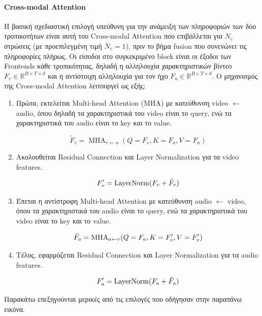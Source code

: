 \paragraph{Cross-modal Attention}
Η βασική σχεδιαστική επιλογή υπεύθυνη για την ανάμειξη των πληροφοριών των δύο τροπικοτήτων είναι αυτή του Cross-modal Attention που επιβάλλεται για $N_c$ στρώσεις (με προεπιλεγμένη τιμή $N_c = 1$), πριν το βήμα fusion που συνενώνει τις πληροφορίες πλήρως. Οι είσοδοι στο συγκεκριμένο block είναι οι έξοδοι των Frontends κάθε τροπικότητας, δηλαδή η αλληλουχία χαρακτηριστικών βίντεο $F_v \in \mathbb{R}^{B \times T \times d}$ και η αντίστοιχη αλληλουχία για τον ήχο $F_a \in \mathbb{R}^{B \times T \times d}$. Ο μηχανισμός της Cross-modal Attention λειτουργεί ως εξής:

\begin{enumerate}
\item Πρώτα, εκτελείται Multi-head Attention (MHA) με κατεύθυνση video $\leftarrow$ audio, όπου δηλαδή τα χαρακτηριστικά του video είναι το query, ενώ τα χαρακτηριστικά του audio είναι το key και το value.

\[
\tilde F_v = \operatorname{MHA}_{v \leftarrow a}(Q = F_v, K = F_a, V = F_a)
\]

\item Ακολουθείται Residual Connection και Layer Normalization για τα video features.

\[
F_v\sp{\prime} = \operatorname{LayerNorm}(F_v + \tilde F_v)
\]

\item Έπεται η αντίστροφη Multi-head Attention με κατεύθυνση audio $\leftarrow$ video, όπου τα χαρακτηριστικά του audio είναι το query, ενώ τα χαρακτηριστικά του video είναι το key και το value.

\[
\tilde F_a = \operatorname{MHA}_{a \leftarrow v}(Q = F_a, K = F_v\sp{\prime}, V = F_v\sp{\prime})
\]

\item Τέλος, εφαρμόζεται Residual Connection και Layer Normalization για τα audio features.

\[
F_a\sp{\prime} = \operatorname{LayerNorm}(F_a + \tilde F_a)
\]
\end{enumerate}

Παρακάτω επεξηγούνται μερικές από τις επιλογές που οδήγησαν στην παραπάνω εικόνα.

